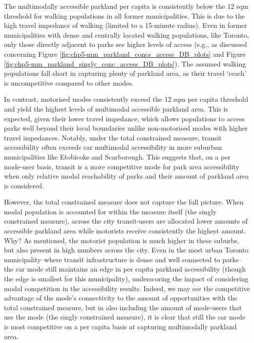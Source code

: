 \documentclass[
11pt, %
oneside, %
english, %
singlespacing, %
]{macthesis} %
\begin{document}
The multimodally accessible parkland per capita is consistently below the 12 sqm threshold for walking populations in all former municipalities. This is due to the high travel impedance of walking (limited to a 15-minute radius). Even in former municipalities with dense and centrally located walking populations, like Toronto, only those directly adjacent to parks see higher levels of access (e.g., as discussed concerning Figure \ref{fig:chp5-mm_parkland_concs_access_DB_plots} and Figure \ref{fig:chp5-mm_parkland_singly_conc_access_DB_plots}). The assumed walking populations fall short in capturing plenty of parkland area, as their travel `reach' is uncompetitive compared to other modes.

In contrast, motorised modes consistently exceed the 12 sqm per capita threshold and yield the highest levels of multimodal accessible parkland area. This is expected, given their lower travel impedance, which allows populations to access parks well beyond their local boundaries unlike non-motorised modes with higher travel impedances. Notably, under the total constrained measure, transit accessibility often exceeds car multimodal accessibility in more suburban municipalities like Etobicoke and Scarborough. This suggests that, on a per mode-user basis, transit is a more competitive mode for park area accessibility when only relative modal reachability of parks and their amount of parkland area is considered.

However, the total constrained measure does not capture the full picture. When modal population is accounted for within the measure itself (the singly constrained measure), across the city transit-users are allocated lower amounts of accessible parkland area while motorists receive consistently the highest amount. Why? As mentioned, the motorist population is much higher in these suburbs, but also present in high numbers across the city. Even in the most urban Toronto municipality--where transit infrastructure is dense and well connected to parks--the car mode still maintains an edge in per capita parkland accessibility (though the edge is smallest for this municipality), underscoring the impact of considering modal competition in the accessibility results. Indeed, we may see the competitive advantage of the mode's connectivity to the amount of opportunities with the total constrained measure, but in also including the amount of mode-users that use the mode (the singly constrained measure), it is clear that still the car mode is most competitive on a per capita basis at capturing multimodally parkland area.
\end{document}
